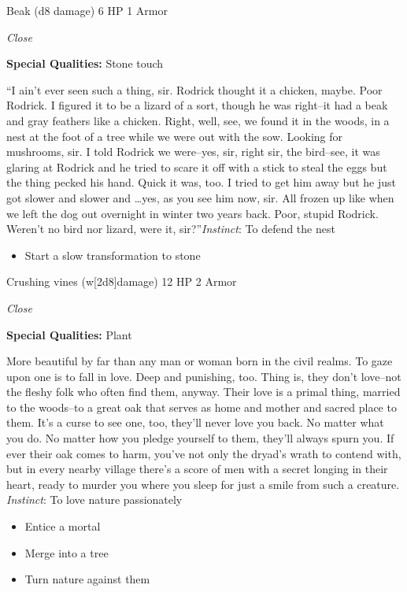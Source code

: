 Beak (d8 damage)\hspace*{\fill} 6 HP 1 Armor

\emph{Close}

\textbf{Special Qualities:}
Stone touch

\HRule
``I ain't ever seen such a thing, sir. Rodrick thought it a chicken, maybe. Poor Rodrick. I figured it to be a lizard of a sort, though he was right--it had a beak and gray feathers like a chicken. Right, well, see, we found it in the woods, in a nest at the foot of a tree while we were out with the sow. Looking for mushrooms, sir. I told Rodrick we were--yes, sir, right sir, the bird--see, it was glaring at Rodrick and he tried to scare it off with a stick to steal the eggs but the thing pecked his hand. Quick it was, too. I tried to get him away but he just got slower and slower and \ldots yes, as you see him now, sir. All frozen up like when we left the dog out overnight in winter two years back. Poor, stupid Rodrick. Weren't no bird nor lizard, were it, sir?''\emph{Instinct}: To defend the nest
\begin{itemize}
\item Start a slow transformation to stone
\end{itemize}
\newpage
\HRule
{}

Crushing vines (w[2d8]damage)\hspace*{\fill} 12 HP 2 Armor

\emph{Close}

\textbf{Special Qualities:}
Plant

\HRule
More beautiful by far than any man or woman born in the civil realms. To gaze upon one is to fall in love. Deep and punishing, too. Thing is, they don't love--not the fleshy folk who often find them, anyway. Their love is a primal thing, married to the woods--to a great oak that serves as home and mother and sacred place to them. It's a curse to see one, too, they'll never love you back. No matter what you do. No matter how you pledge yourself to them, they'll always spurn you. If ever their oak comes to harm, you've not only the dryad's wrath to contend with, but in every nearby village there's a score of men with a secret longing in their heart, ready to murder you where you sleep for just a smile from such a creature. \emph{Instinct}: To love nature passionately
\begin{itemize}
\item Entice a mortal
\item Merge into a tree
\item Turn nature against them
\end{itemize}
\newpage
\HRule
{}

